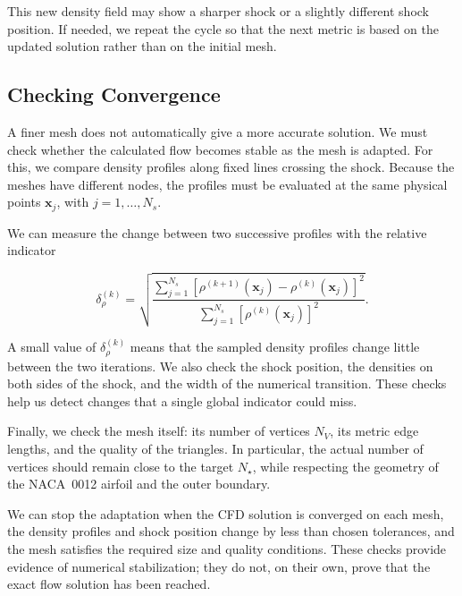 \documentclass[11pt,a4paper]{article}
\newcommand{\naca}{NACA~0012}
\begin{document}
\noindent This new density field may show a sharper shock
or a slightly different shock position. If needed, we
repeat the cycle so that the next metric is based on the
updated solution rather than on the initial mesh.

\subsection{Checking Convergence}

\noindent A finer mesh does not automatically give a more
accurate solution. We must check whether the calculated
flow becomes stable as the mesh is adapted. For this, we
compare density profiles along fixed lines crossing the
shock. Because the meshes have different nodes, the
profiles must be evaluated at the same physical points
$\mathbf x_j$, with $j=1,\ldots,N_s$.

\noindent We can measure the change between two successive
profiles with the relative indicator

\begin{equation}
    \label{eq:density_iteration_change}
    \boxed{
    \delta_\rho^{(k)}=
    \sqrt{
    \dfrac{
        \displaystyle\sum_{j=1}^{N_s}
        \left[\rho^{(k+1)}(\mathbf x_j)
        -\rho^{(k)}(\mathbf x_j)\right]^2
    }{
        \displaystyle\sum_{j=1}^{N_s}
        \left[\rho^{(k)}(\mathbf x_j)\right]^2
    }}.
    }
\end{equation}

\noindent A small value of $\delta_\rho^{(k)}$ means that
the sampled density profiles change little between the
two iterations. We also check the shock position, the
densities on both sides of the shock, and the width of
the numerical transition. These checks help us detect
changes that a single global indicator could miss.

\noindent Finally, we check the mesh itself: its number
of vertices $N_V$, its metric edge lengths, and the
quality of the triangles. In particular, the actual
number of vertices should remain close to the target
$N_\star$, while respecting the geometry of the \naca{}
airfoil and the outer boundary.

\noindent We can stop the adaptation when the CFD solution
is converged on each mesh, the density profiles and shock
position change by less than chosen tolerances, and the
mesh satisfies the required size and quality conditions.
These checks provide evidence of numerical stabilization;
they do not, on their own, prove that the exact flow
solution has been reached.
\end{document}
